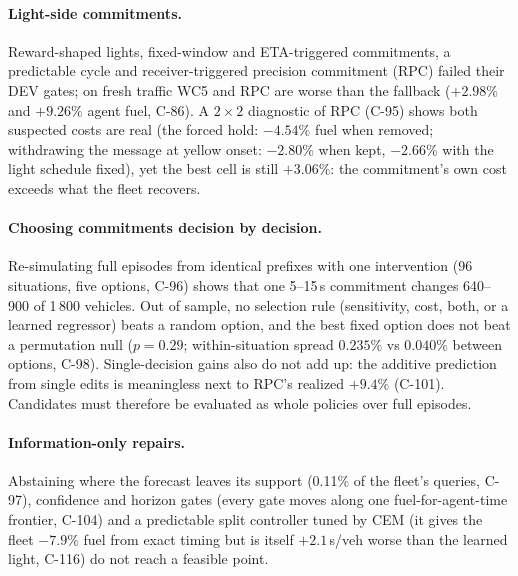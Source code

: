 \documentclass[11pt]{article}
\begin{document}
\paragraph{Light-side commitments.} Reward-shaped lights, fixed-window and ETA-triggered commitments, a predictable cycle and
receiver-triggered precision commitment (RPC) failed their DEV gates; on fresh traffic WC5 and RPC are worse than the fallback
($+2.98\%$ and $+9.26\%$ agent fuel, C-86). A $2\times2$ diagnostic of RPC (C-95) shows both suspected costs are real (the forced hold:
$-4.54\%$ fuel when removed; withdrawing the message at yellow onset: $-2.80\%$ when kept, $-2.66\%$ with the light schedule fixed), yet the best
cell is still $+3.06\%$: the commitment's own cost exceeds what the fleet recovers.
\paragraph{Choosing commitments decision by decision.} Re-simulating full episodes from identical prefixes with one intervention
(96 situations, five options, C-96) shows that one 5--15\,s commitment changes 640--900 of 1\,800 vehicles. Out of sample, no selection
rule (sensitivity, cost, both, or a learned regressor) beats a random option, and the best fixed option does not beat a permutation null
($p=0.29$; within-situation spread $0.235\%$ vs $0.040\%$ between options, C-98). Single-decision gains also do not add up: the
additive prediction from single edits is meaningless next to RPC's realized $+9.4\%$ (C-101). Candidates must therefore be evaluated as
whole policies over full episodes.
\paragraph{Information-only repairs.} Abstaining where the forecast leaves its support (0.11\% of the fleet's queries, C-97), confidence and
horizon gates (every gate moves along one fuel-for-agent-time frontier, C-104) and a predictable split controller tuned by CEM (it gives the
fleet $-7.9\%$ fuel from exact timing but is itself $+2.1$\,s/veh worse than the learned light, C-116) do not reach a feasible point.
\end{document}
